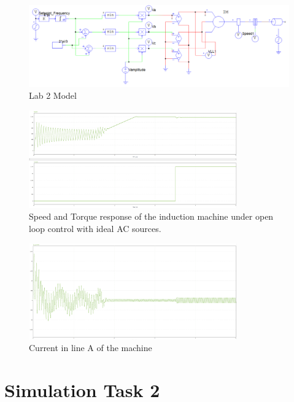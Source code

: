 \documentclass[12pt,a4paper]{report}
\begin{document}
\begin{figure}
    \centering
    \includegraphics[width=0.55\paperwidth,keepaspectratio,angle=90]{Lab2Model.png}
    \caption{Lab 2 Model}
    \label{fig:ideal-sources}
\end{figure}

\begin{figure}[H]
    \centering
    \includegraphics[width=0.8\textwidth]{GraphsLab2.png}
    \caption{Speed and Torque response of the induction machine under open loop control with ideal AC sources.}
    \label{fig:speed-torque-response}
\end{figure}

\begin{figure}
    \centering
    \includegraphics[width=0.8\textwidth]{CurrenLab2.png}
    \caption{Current in line A of the machine}
    \label{fig:current-line-a}
\end{figure}

\chapter{Simulation Task 2}
\label{sec:simulation-task-2}
\end{document}
